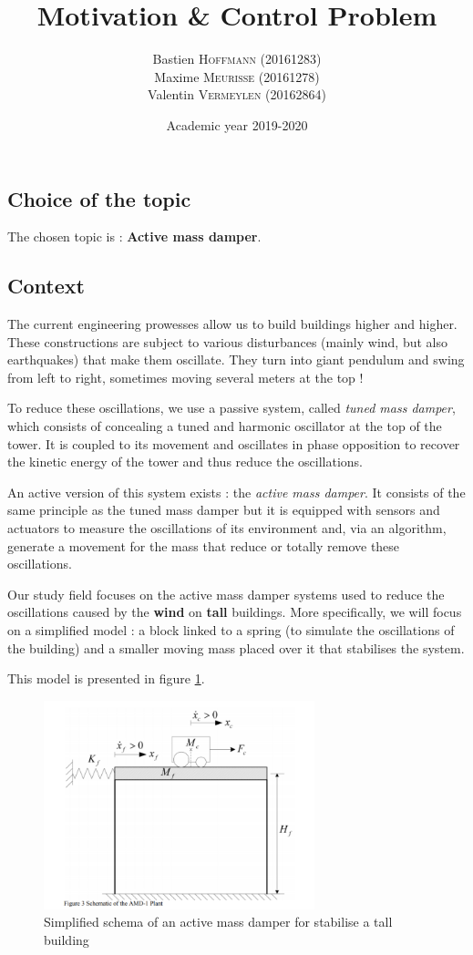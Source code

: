 \documentclass[a4paper, 12pt]{article}
\title{Motivation \& Control Problem}
\author{
    Bastien \textsc{Hoffmann} (20161283)\\
    Maxime \textsc{Meurisse} (20161278)\\
    Valentin \textsc{Vermeylen} (20162864)\\
}
\date{Academic year 2019-2020}
\begin{document}
    
    
    \subsection{Choice of the topic}
    The chosen topic is : {\bf Active mass damper}.
    
    \subsection{Context}
    The current engineering prowesses allow us to build buildings higher and higher. These constructions are subject to various disturbances (mainly wind, but also earthquakes) that make them oscillate. They turn into giant pendulum and swing from left to right, sometimes moving several meters at the top !\cite{YouTube_minutephysics}\par
    To reduce these oscillations, we use a passive system, called {\it tuned mass damper}, which consists of concealing a tuned and harmonic oscillator at the top of the tower. It is coupled to its movement and oscillates in phase opposition to recover the kinetic energy of the tower and thus reduce the oscillations.\cite{Wikipedia_amortisseur_tmd}\par
    An active version of this system exists : the {\it active mass damper}. It consists of the same principle as the tuned mass damper but it is equipped with sensors and actuators to measure the oscillations of its environment and, via an algorithm, generate a movement for the mass that reduce or totally remove these oscillations.\cite{sciencedirect_amd}\par
    Our study field focuses on the active mass damper systems used to reduce the oscillations caused by the {\bf wind} on {\bf tall} buildings. More specifically, we will focus on a simplified model : a block linked to a spring (to simulate the oscillations of the building) and a smaller moving mass placed over it that stabilises the system.\par
    This model is presented in figure \ref{fig:schema}.
    \begin{figure}[!ht]
        \centering
        \includegraphics[width=0.7\textwidth]{resources/pdf/schema.pdf}
        \caption{Simplified schema of an active mass damper for stabilise a tall building}
        \label{fig:schema}
    \end{figure}
    
\end{document}
